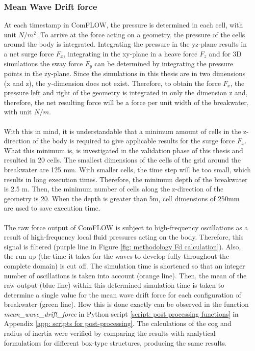\subsubsection{Mean Wave Drift force}
At each timestamp in ComFLOW, the pressure is determined in each cell, with unit $N/m^2$. To arrive at the force acting on a geometry, the pressure of the cells around the body is integrated. Integrating the pressure in the yz-plane results in a net surge force $F_x$, integrating in the xy-plane in a heave force $F_z$ and for 3D simulations the sway force $F_y$ can be determined by integrating the pressure points in the zy-plane. Since the simulations in this thesis are in two dimensions (x and z), the y-dimension does not exist. Therefore, to obtain the force $F_x$, the pressure left and right of the geometry is integrated in only the dimension z and, therefore, the net resulting force will be a force per unit width of the breakwater, with unit $N/m$.\\
\\
With this in mind, it is understandable that a minimum amount of cells in the z-direction of the body is required to give applicable results for the surge force $F_x$. What this minimum is, is investigated in the validation phase of this thesis and resulted in 20 cells. The smallest dimensions of the cells of the grid around the breakwater are 125 mm. With smaller cells, the time step will be too small, which results in long execution times. Therefore, the minimum depth of the breakwater is 2.5 m. Then, the minimum number of cells along the z-direction of the geometry is 20. When the depth is greater than 5m, cell dimensions of 250mm are used to save execution time. \\
\\
The raw force output of ComFLOW is subject to high-frequency oscillations as a result of high-frequency local fluid pressures acting on the body. Therefore, this signal is filtered (purple line in Figure \ref{fig: methodology Fd calculation}). Also, the run-up (the time it takes for the waves to develop fully throughout the complete domain) is cut off. The simulation time is shortened so that an integer number of oscillations is taken into account (orange line). Then, the mean of the raw output (blue line) within this determined simulation time is taken to determine a single value for the mean wave drift force for each configuration of breakwater (green line). How this is done exactly can be observed in the function \textit{mean\_wave\_drift\_force} in Python script \ref{script: post processing functions} in Appendix \ref{app: scripts for post-processing}. The calculations of the \acrshort{cog} and radius of inertia were verified by comparing the results with analytical formulations for different box-type structures, producing the same results.\
